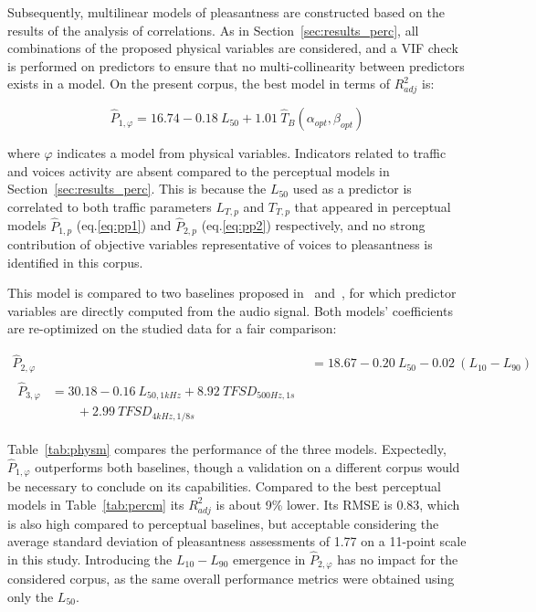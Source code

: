 \documentclass[twocolumn]{article}
\begin{document}
Subsequently, multilinear models of pleasantness are constructed based on the results of the analysis of correlations. As in Section~\ref{sec:results_perc}, all combinations of the proposed physical variables are considered, and a VIF check is performed on predictors to ensure that no multi-collinearity between predictors exists in a model. On the present corpus, the best model in terms of $R^2_{adj}$ is:

\begin{equation}
\hat P_{1, \varphi} = 16.74 - 0.18~L_{50} + 1.01~\hat T_B(\alpha_{opt}, \beta_{opt}) \label{eq:pphi}
\end{equation}

where $\varphi$ indicates a model from physical variables. Indicators related to traffic and voices activity are absent compared to the perceptual models in Section~\ref{sec:results_perc}. This is because the $L_{50}$ used as a predictor is correlated to both traffic parameters $L_{T, p}$ and $T_{T, p}$ that appeared in perceptual models $\hat P_{1, p}$ (eq.\ref{eq:pp1}) and $\hat P_{2, p}$ (eq.\ref{eq:pp2}) respectively, and no strong contribution of objective variables representative of voices to pleasantness is identified in this corpus.

This model is compared to two baselines proposed in~\cite{ricciardi2014} and~\cite{aumond2017}, for which predictor variables are directly computed from the audio signal. Both models' coefficients are re-optimized on the studied data for a fair comparison:

\begin{align}
\hat P_{2, \varphi} &= 18.67 - 0.20~L_{50} - 0.02~(L_{10}-L_{90})\\
\begin{split}
\hat P_{3, \varphi} &= 30.18 - 0.16~L_{50, 1kHz} + 8.92~TFSD_{500Hz, 1s} \\
&\qquad + 2.99~TFSD_{4kHz, 1/8s}
\end{split}
\end{align}

Table~\ref{tab:physm} compares the performance of the three models. Expectedly, $\hat P_{1, \varphi}$ outperforms both baselines, though a validation on a different corpus would be necessary to conclude on its capabilities. Compared to the best perceptual models in Table~\ref{tab:percm} its $R^2_{adj}$ is about 9\% lower. Its RMSE is 0.83, which is also high compared to perceptual baselines, but acceptable considering the average standard deviation of pleasantness assessments of 1.77 on a 11-point scale in this study. Introducing the $L_{10}-L_{90}$ emergence in $\hat P_{2, \varphi}$ has no impact for the considered corpus, as the same overall performance metrics were obtained using only the $L_{50}$.
\end{document}
